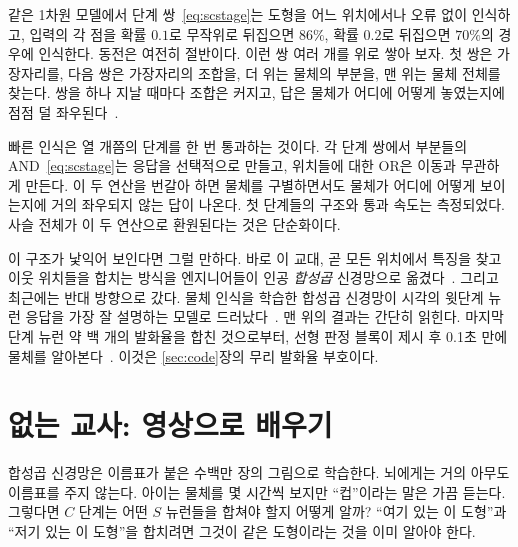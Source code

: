 같은 1차원 모델에서 단계 쌍~\eqref{eq:scstage}는 도형을 어느 위치에서나 오류 없이 인식하고, 입력의 각 점을 확률 $0.1$로 무작위로 뒤집으면 $86\%$, 확률 $0.2$로 뒤집으면 $70\%$의 경우에 인식한다. 동전은 여전히 절반이다. 이런 쌍 여러 개를 위로 쌓아 보자. 첫 쌍은 가장자리를, 다음 쌍은 가장자리의 조합을, 더 위는 물체의 부분을, 맨 위는 물체 전체를 찾는다. 쌍을 하나 지날 때마다 조합은 커지고, 답은 물체가 어디에 어떻게 놓였는지에 점점 덜 좌우된다~\cite{Riesenhuber1999}.

\begin{keyblock}
\begin{proposition}
\label{prop:conveyor}
빠른 인식은 열 개쯤의 단계를 한 번 통과하는 것이다. 각 단계 쌍에서 부분들의 AND~\eqref{eq:scstage}는 응답을 선택적으로 만들고, 위치들에 대한 OR은 이동과 무관하게 만든다. 이 두 연산을 번갈아 하면 물체를 구별하면서도 물체가 어디에 어떻게 보이는지에 거의 좌우되지 않는 답이 나온다. 첫 단계들의 구조와 통과 속도는 측정되었다. 사슬 전체가 이 두 연산으로 환원된다는 것은 단순화이다.
\end{proposition}
\end{keyblock}

이 구조가 낯익어 보인다면 그럴 만하다. 바로 이 교대, 곧 모든 위치에서 특징을 찾고 이웃 위치들을 합치는 방식을 엔지니어들이 인공 \emph{합성곱} 신경망으로 옮겼다~\cite{Fukushima1980}. 그리고 최근에는 반대 방향으로 갔다. 물체 인식을 학습한 합성곱 신경망이 시각의 윗단계 뉴런 응답을 가장 잘 설명하는 모델로 드러났다~\cite{Yamins2014}. 맨 위의 결과는 간단히 읽힌다. 마지막 단계 뉴런 약 백 개의 발화율을 합친 것으로부터, 선형 판정 블록이 제시 후 0.1초 만에 물체를 알아본다~\cite{Hung2005}. 이것은 \ref{sec:code}장의 무리 발화율 부호이다.

\section{없는 교사: 영상으로 배우기}

합성곱 신경망은 이름표가 붙은 수백만 장의 그림으로 학습한다. 뇌에게는 거의 아무도 이름표를 주지 않는다. 아이는 물체를 몇 시간씩 보지만 “컵”이라는 말은 가끔 듣는다. 그렇다면 $C$ 단계는 어떤 $S$ 뉴런들을 합쳐야 할지 어떻게 알까? “여기 있는 이 도형”과 “저기 있는 이 도형”을 합치려면 그것이 같은 도형이라는 것을 이미 알아야 한다.


